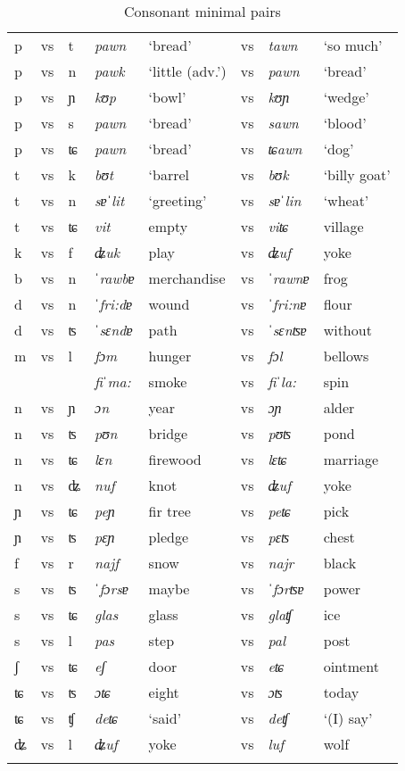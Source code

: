 \begin{table}
\caption{Consonant minimal pairs}
\label{cmp}
 \begin{tabular}{llllllll}
 \lsptoprule
p&vs&t&\textit{pawn}&`bread'&vs&\textit{tawn}&`so much'\\
p&vs&n&\textit{pawk}&`little (adv.')&vs&\textit{pawn}&`bread' \\
p&vs&ɲ&\textit{kʊp}&`bowl'&vs&\textit{kʊɲ}&`wedge' \\
p&vs&s&\textit{pawn}&`bread'&vs&\textit{sawn}&`blood' \\
p&vs&ʨ&\textit{pawn}&`bread'&vs&\textit{ʨawn}&`dog' \\
t&vs&k& \textit{bʊt}&`barrel&vs&\textit{bʊk}&`billy goat' \\
t&vs&n&\textit{sɐˈlit}&`greeting'&vs&\textit{sɐˈlin}&`wheat' \\
t&vs&ʨ&\textit{vit}&empty&vs&\textit{viʨ}&village \\
k&vs&f&\textit{ʥuk}&play&vs&\textit{ʥuf}&yoke\\
b&vs&n&\textit{ˈrawbɐ}&merchandise&vs&\textit{ˈrawnɐ}&frog\\
d&vs&n&\textit{ˈfri:dɐ}&wound&vs&\textit{ˈfri:nɐ}&flour\\
d&vs&ʦ&\textit{ˈsɛndɐ}&path&vs&\textit{ˈsɛnʦɐ}&without\\
m&vs&l&\textit{fɔm} & hunger & vs & \textit{fɔl} & bellows\\
&&&\textit{fiˈma:}& smoke & vs& \textit{fiˈla:}& spin\\
n&vs&ɲ&\textit{ɔn}&year&vs&\textit{ɔɲ}&alder\\
n&vs&ʦ&\textit{pʊn}&bridge&vs&\textit{pʊʦ}&pond\\
n&vs&ʨ&\textit{lɛn}&firewood&vs&\textit{lɛʨ}&marriage\\
n&vs&ʥ& \textit{nuf}&knot&vs&\textit{ʥuf}&yoke\\
ɲ&vs&ʨ&\textit{peɲ}&fir tree&vs&\textit{peʨ} & pick\\
ɲ&vs&ʦ&\textit{pɛɲ}&pledge&vs&\textit{pɛʦ}&chest\\
f&vs&r& \textit{najf} &snow&vs&\textit{najr}&black\\
s&vs&ʦ&\textit{ˈfɔrsɐ}&maybe&vs&\textit{ˈfɔrʦɐ}&power\\
s&vs&ʨ&\textit{glas}&glass&vs&\textit{glaʧ}&ice\\
s&vs&l& \textit{pas}&step&vs&\textit{pal}&post\\
ʃ&vs&ʨ&\textit{eʃ}&door&vs &\textit{eʨ}&ointment\\
ʨ&vs&ʦ&\textit{ɔʨ}&eight&vs&\textit{ɔʦ}&today\\
ʨ&vs&ʧ&\textit{deʨ}&`said'&vs&\textit{deʧ}&`(I) say'\\
ʥ&vs&l&\textit{ʥuf}&yoke&vs&\textit{luf}&wolf\\
  \lspbottomrule
 \end{tabular}
\end{table}

